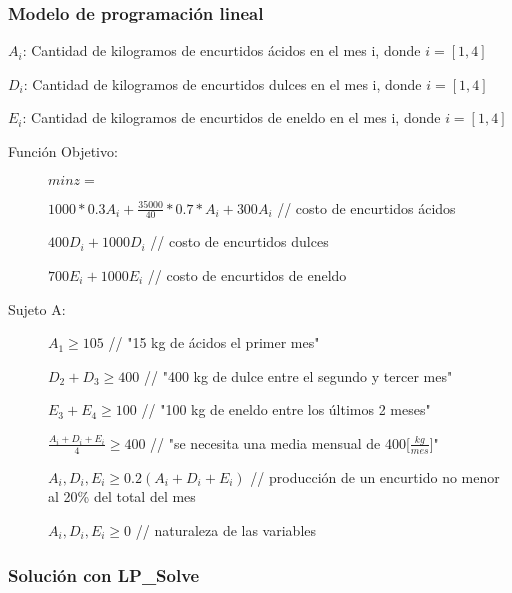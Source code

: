 \subsubsection{Modelo de programación lineal}
\begin{description}
\item[Variables:]
\item $A_i$: Cantidad de kilogramos de encurtidos ácidos en el mes i, donde $i=[1,4]$
\item $D_i$: Cantidad de kilogramos de encurtidos dulces en el mes i, donde $i=[1,4]$
\item $E_i$: Cantidad de kilogramos de encurtidos de eneldo en el mes i, donde $i=[1,4]$
\end{description}

\begin{description}
\item[Función Objetivo:]
\item[] $min z =$
\item[] $1000*0.3A_i + \frac{35000}{40}*0.7*A_i+300A_i$ // costo de encurtidos ácidos
\item[] $400D_i + 1000D_i$ // costo de encurtidos dulces
\item[] $700E_i + 1000E_i$ // costo de encurtidos de eneldo 
\end{description}

\begin{description}
\item[Sujeto A:]
\item[] $A_1 \geq 105$ // "15 kg de ácidos el primer mes"
\item[] $D_2 + D_3 \geq 400$ // "400 kg de dulce entre el segundo y tercer mes"
\item[] $E_3 + E_4 \geq 100$ // "100 kg de eneldo entre los últimos 2 meses"
\item[] $\frac{A_i+D_i+E_i}{4} \geq 400$ // "se necesita una media mensual de 400[$\frac{kg}{mes}$]"
\item[] $A_i, D_i, E_i \geq 0.2(A_i+D_i+E_i)$ // producción de un encurtido no menor al 20\% del total del mes
\item[] $A_i, D_i, E_i \geq 0$ // naturaleza de las variables
\end{description}

\subsubsection{Solución con LP\_Solve}

